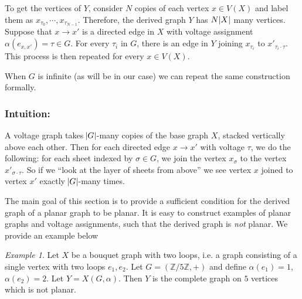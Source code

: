 \documentclass{amsart}
\numberwithin{equation}{section}
\theoremstyle{remark}
\newtheorem{example}[theorem]{Example}
\newcommand{\Z}{\mathbb{Z}}
\theoremstyle{plain} %
\begin{document}
To get the vertices of $Y$, consider $N$ copies of each vertex $x \in V (X)$ and label them as $x_{\tau_0}, \cdots, x_{\tau_{N-1}}$.
Therefore, the derived graph $Y$ has $N \abs{X}$ many vertices.
Suppose that $x \to x'$ is a directed edge in $X$ with voltage assignment $\alpha(e_{x,x'}) = \tau \in G$.
For every $\tau_i$ in $G$, there is an edge in $Y$ joining $x_{\tau_i}$ to $x'_{\tau_i \cdot \tau}$.
This process is then repeated for every $x\in V(X)$.

When $G$ is infinite (as will be in our case) we can repeat the same construction formally.


\subsubsection*{Intuition:}
A voltage graph takes $\abs{G}$-many copies of the base graph $X$, stacked vertically above each other.
Then for each directed edge $x \to x'$ with voltage $\tau$, we do the following: for each sheet indexed by $\sigma \in G$, we join the vertex $x_{\sigma}$ to the vertex $x'_{\sigma \cdot \tau}$.
So if we ``look at the layer of sheets from above'' we see vertex $x$ joined to vertex $x'$ exactly $\abs{G}$-many times.

\bigskip

The main goal of this section is to provide a sufficient condition for the derived graph of a planar graph to be planar.
It is easy to construct examples of planar graphs and voltage assignments, such that the derived graph is \textit{not} planar.
We provide an example below
\begin{example}
Let $X$ be a bouquet graph with two loops, i.e. a graph consisting of a single vertex with two loops $e_1,e_2$. Let $G=(\Z/5\Z,+)$ and define $\alpha(e_1)=1$, $\alpha(e_2)=2$. Let $Y=X(G,\alpha)$. Then $Y$ is the complete graph on $5$ vertices which is not planar.

\begin{center}
\hspace{1cm}
\end{center}
\end{example}
\end{document}
